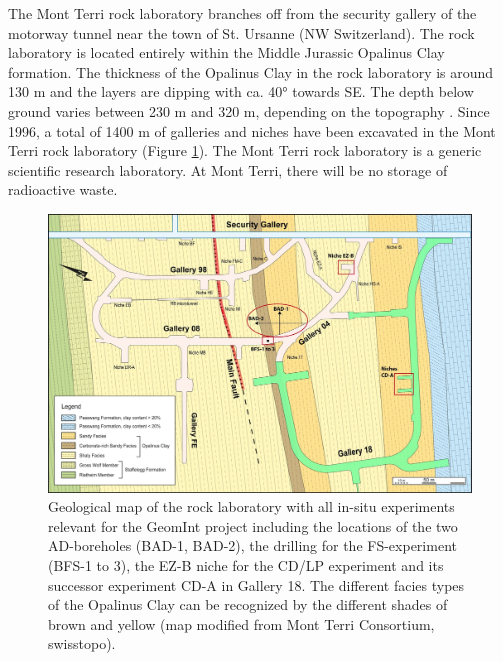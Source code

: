 The Mont Terri rock laboratory branches off from the security gallery of the motorway tunnel near the town of St. Ursanne (NW Switzerland). The rock laboratory is located entirely within the Middle Jurassic Opalinus Clay formation. The thickness of the Opalinus Clay in the rock laboratory is around 130 m \cite{hostettler2018} and the layers are dipping with ca. 40° towards SE. The depth below ground varies between 230 m and 320 m, depending on the topography \cite{heitzmann2001}. Since 1996, a total of 1400 m of galleries and niches have been excavated in the Mont Terri rock laboratory (Figure \ref{fig:bgr_mt_topview}). The Mont Terri rock laboratory is a generic scientific research laboratory. At Mont Terri, there will be no storage of radioactive waste.

\begin{figure}[!ht]
\centering
\includegraphics[width=1\textwidth]{./figures/bgr_mont_terri_top_view.jpg}
\caption{Geological map of the rock laboratory with all in-situ experiments relevant for the GeomInt project including the locations of the two AD-boreholes (BAD-1, BAD-2), the drilling for the FS-experiment (BFS-1 to 3), the EZ-B niche for the CD/LP experiment and its successor experiment CD-A in Gallery 18. The different facies types of the Opalinus Clay can be recognized by the different shades of brown and yellow (map modified from Mont Terri Consortium, swisstopo).}
\label{fig:bgr_mt_topview}
\end{figure}

